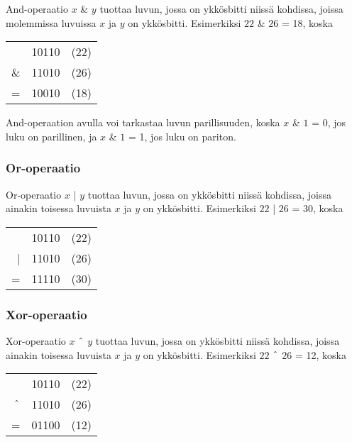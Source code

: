 And-operaatio $x$ \& $y$ tuottaa luvun,
jossa on ykkösbitti niissä kohdissa,
joissa molemmissa luvuissa $x$ ja $y$ on ykkösbitti.
Esimerkiksi $22$ \& $26$ = 18, koska

\begin{center}
\begin{tabular}{rrr}
& 10110 & (22)\\
\& & 11010 & (26) \\
\hline
 = & 10010 & (18) \\
\end{tabular}
\end{center}

And-operaation avulla voi tarkastaa luvun parillisuuden,
koska $x$ \& $1$ = 0, jos luku on parillinen,
ja $x$ \& $1$ = 1, jos luku on pariton.

\subsubsection{Or-operaatio}

Or-operaatio $x$ | $y$ tuottaa luvun,
jossa on ykkösbitti niissä kohdissa,
joissa ainakin toisessa luvuista $x$ ja $y$ on ykkösbitti.
Esimerkiksi $22$ | $26$ = 30, koska

\begin{center}
\begin{tabular}{rrr}
& 10110 & (22)\\
| & 11010 & (26) \\
\hline
 = & 11110 & (30) \\
\end{tabular}
\end{center}

\subsubsection{Xor-operaatio}

Xor-operaatio $x$ $\XOR$ $y$ tuottaa luvun,
jossa on ykkösbitti niissä kohdissa,
joissa ainakin toisessa luvuista $x$ ja $y$ on ykkösbitti.
Esimerkiksi $22$ $\XOR$ $26$ = 12, koska

\begin{center}
\begin{tabular}{rrr}
& 10110 & (22)\\
$\XOR$ & 11010 & (26) \\
\hline
 = & 01100 & (12) \\
\end{tabular}
\end{center}

